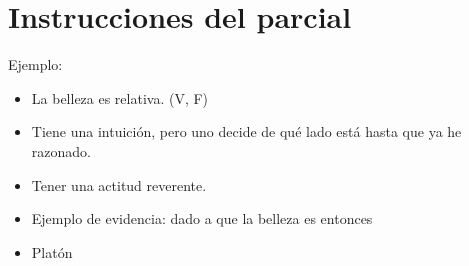 \section{Instrucciones del parcial}
Ejemplo:
\begin{itemize}
    \item La belleza es relativa. (V, F)
    \item Tiene una intuición, pero uno decide de qué lado está hasta que ya he razonado. 
    \item Tener una actitud reverente.
    \item Ejemplo de evidencia: dado a que la belleza es  entonces  
    \item Platón  
\end{itemize}

